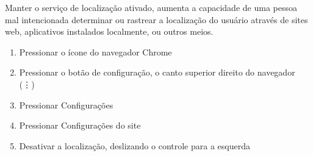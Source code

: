 Manter o servi\c co de localiza\c c\~ao ativado, aumenta a capacidade de uma pessoa mal intencionada determinar ou rastrear a localiza\c c\~ao do usu\'ario atrav\'es de sites web, aplicativos instalados localmente, ou outros meios.

\begin{enumerate}
\item Pressionar o \'icone do navegador Chrome
\item Pressionar o bot\~ao de configura\c c\~ao, o canto superior direito do navegador (\vdots)
\item Pressionar Configura\c c\~oes
\item Pressionar Configura\c c\~oes do site
\item Desativar a localiza\c c\~ao, deslizando o controle para a esquerda
\end{enumerate}
